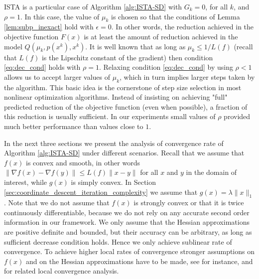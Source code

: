\documentclass[11pt]{article}
\numberwithin{equation}{section}
\begin{document}
 ISTA  \cite{Beck2009} is a particular case of Algorithm \ref{alg:ISTA-SD} with $G_k=0$, for all $k$, and $\rho=1$. 
In this case, the value of  $\mu_k$ is chosen so that the conditions of Lemma \ref{lem:subp_inexact} hold with $\epsilon=0$. In other words, the reduction achieved in the objective function $F(x)$ is at least the amount of reduction achieved in the model 
$ Q(\mu_k,p(x^k),x^k)$. It is well known that as long as $\mu_k\leq 1/L(f)$ (recall that $L(f)$ is the Lipschitz constant of the gradient) then  condition \eqref{eq:dec_cond}
 holds with $\rho=1$.  Relaxing condition \eqref{eq:dec_cond} by using $\rho<1$ allows us to accept larger values of $\mu_k$, which in turn implies larger steps taken by the algorithm.   This basic idea is the cornerstone of step size selection in most nonlinear optimization algorithms. Instead of insisting on achieving "full" predicted reduction of the objective function (even when possible), a fraction of this reduction is usually sufficient. In our experiments small values of $\rho$ provided much better performance than values close to $1$. 


In the next three sections we present the analysis of convergence rate of  Algorithm \ref{alg:ISTA-SD} under different scenarios. Recall that we assume that $f(x)$ is convex and smooth, in other words $\|\nabla f(x)-\nabla f(y)\|\leq L(f)\|x-y\|$ for all $x$ and $y$ in the domain of interest, while $g(x)$ is simply convex. In Section \ref{sec:coordinate_descent_iteration_complexity} we assume that $g(x)=\lambda \|x\|_1$. Note that we do not assume that $f(x)$ is strongly convex or that it is twice continuously differentiable, because we do not rely on any accurate second order information in our framework. We only assume that the Hessian approximations are positive definite and bounded, but their accuracy can be arbitrary, as long as sufficient decrease condition holds. Hence we only achieve sublinear rate of convergence. To achieve higher local rates of convergence stronger assumptions on $f(x)$ and on the Hessian approximations have to be made, see for instance, \cite{Byrdetal2013} and \cite{Saundersetal} for related local convergence analysis. 
\end{document}
